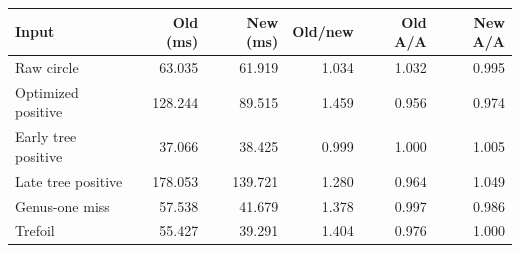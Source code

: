 \begin{tabular}{lrrrrr}
\toprule
Input & Old (ms) & New (ms) & Old/new & Old A/A & New A/A \\
\midrule
Raw circle & 63.035 & 61.919 & 1.034 & 1.032 & 0.995 \\
Optimized positive & 128.244 & 89.515 & 1.459 & 0.956 & 0.974 \\
Early tree positive & 37.066 & 38.425 & 0.999 & 1.000 & 1.005 \\
Late tree positive & 178.053 & 139.721 & 1.280 & 0.964 & 1.049 \\
Genus-one miss & 57.538 & 41.679 & 1.378 & 0.997 & 0.986 \\
Trefoil & 55.427 & 39.291 & 1.404 & 0.976 & 1.000 \\
\bottomrule
\end{tabular}
